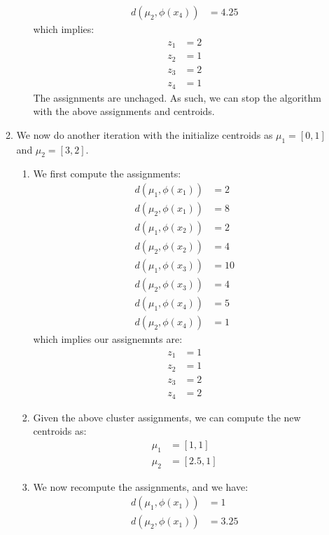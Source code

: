 \documentclass[12pt]{article}
\begin{document}
\begin{enumerate}[label=(\alph*)]
\begin{enumerate}
\begin{enumerate}[label=(\arabic*)]
\begin{align*}
        d(\mu_2, \phi(x_4)) &= 4.25
      \end{align*}
      which implies:
      \begin{align*}
        z_1 &= 2 \\
        z_2 &= 1 \\
        z_3 &= 2 \\
        z_4 &= 1
      \end{align*}
      The assignments are unchaged. As such, we can stop the algorithm with the above assignments and centroids.
    \end{enumerate}
    \item We now do another iteration with the initialize centroids as $\mu_1 = [0,1]$ and $\mu_2 = [3,2]$.
    \begin{enumerate}
      \item We first compute the assignments:
        \begin{align*}
          d(\mu_1, \phi(x_1)) &= 2 \\
          d(\mu_2, \phi(x_1)) &= 8 \\
          d(\mu_1, \phi(x_2)) &= 2 \\
          d(\mu_2, \phi(x_2)) &= 4 \\
          d(\mu_1, \phi(x_3)) &= 10 \\
          d(\mu_2, \phi(x_3)) &= 4 \\
          d(\mu_1, \phi(x_4)) &= 5 \\
          d(\mu_2, \phi(x_4)) &= 1
        \end{align*}
        which implies our assignemnts are:
        \begin{align*}
          z_1 &= 1 \\
          z_2 &= 1 \\
          z_3 &= 2 \\
          z_4 &= 2
        \end{align*}
      \item Given the above cluster assignments, we can compute the new centroids as:
        \begin{align*}
          \mu_1 &= [1, 1] \\
          \mu_2 &= [2.5, 1]
        \end{align*}
      \item We now recompute the assignments, and we have:
        \begin{align*}
          d(\mu_1, \phi(x_1)) &= 1 \\
          d(\mu_2, \phi(x_1)) &= 3.25 \\

\end{align*}
\end{enumerate}
\end{enumerate}
\end{enumerate}
\end{document}
